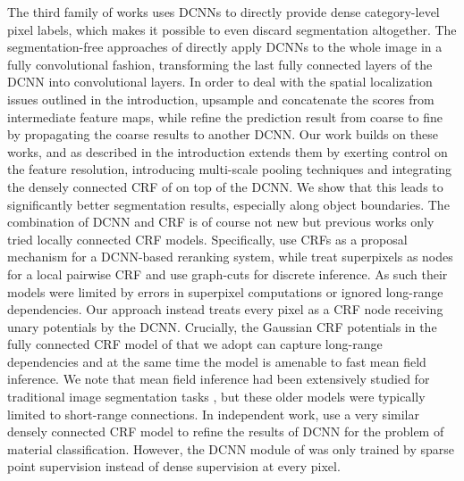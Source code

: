 \documentclass[10pt,journal,compsoc]{IEEEtran}
\begin{document}
The third family of works uses DCNNs to directly provide dense category-level pixel labels, which makes it 
possible to even discard segmentation altogether. 
The segmentation-free approaches of
\cite{long2014fully, eigen2014predicting} directly apply DCNNs to the whole
image in a fully convolutional fashion, transforming the last fully connected
layers of the DCNN into convolutional layers. In order to deal with the spatial
localization issues outlined in the introduction, \cite{long2014fully} upsample
and concatenate the scores from intermediate feature maps, while
\cite{eigen2014predicting} refine the prediction result from coarse to fine by
propagating the coarse results to another DCNN.
Our work builds on  these works, and as described in the introduction 
extends them by exerting control on the feature resolution, introducing multi-scale pooling techniques
and integrating  the
densely connected CRF of \cite{krahenbuhl2011efficient} on top of the DCNN. We
show that this leads to significantly better segmentation results, especially
along object boundaries. The combination of DCNN and CRF is of course not new
but previous works only tried locally connected CRF models. Specifically,
\cite{cogswell2014combining} use CRFs as a proposal mechanism for a DCNN-based
reranking system, while \cite{farabet2013learning} treat superpixels as nodes
for a local pairwise CRF and use graph-cuts for discrete inference. As such
their models were limited by errors in superpixel computations or ignored
long-range dependencies. Our approach instead treats every pixel as a CRF node
receiving unary potentials by the DCNN. Crucially, the Gaussian CRF potentials
in the fully connected CRF model of \cite{krahenbuhl2011efficient} that we adopt
can capture long-range dependencies and at the same time the model is amenable
to fast mean field inference. We note that mean field inference had been
extensively studied for traditional image segmentation tasks
\cite{geiger1991parallel, geiger1991common, kokkinos2008computational}, but
these older models were typically limited to short-range connections. In
independent work, \cite{bell2014material} use a very similar densely connected
CRF model to refine the results of DCNN for the problem of material
classification. However, the DCNN module of \cite{bell2014material} was only
trained by sparse point supervision instead of dense supervision at every pixel.
\end{document}

